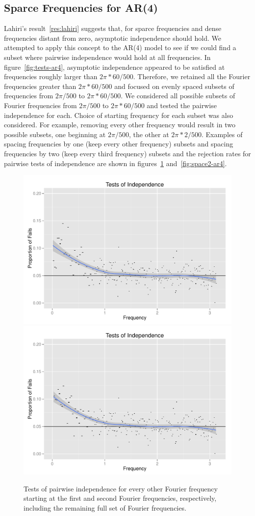 \documentclass{article}\usepackage[]{graphicx}\usepackage[]{color}
\newenvironment{knitrout}{}{} %
\theoremstyle{plain}
\begin{document}
\subsection{Sparce Frequencies for AR(4)} \label{sec:sparce}
Lahiri's result~\ref{res:lahiri} suggests that, for sparce frequencies and dense frequencies distant from zero, asymptotic independence should hold. We attempted to apply this concept to the AR(4) model to see if we could find a subset where pairwise independence would hold at all frequencies. In figure~\ref{fig:tests-ar4}, asymptotic independence appeared to be satisfied at frequencies roughly larger than $2 \pi*60/500$.  Therefore, we retained all the Fourier frequencies greater than $2 \pi*60/500$ and focused on evenly spaced subsets of frequencies from $2\pi/500$ to $2\pi*60/500$. We considered all possible subsets of Fourier frequencies from $2\pi/500$ to $2\pi* 60/500$ and tested the pairwise independence for each. Choice of starting frequency for each subset was also considered. For example, removing every other frequency would result in two possible subsets, one beginning at $2\pi/500$, the other at $2\pi*2/500$. Examples of spacing frequencies by one (keep every other frequency) subsets and spacing frequencies by two (keep every third frequency) subsets and the rejection rates for pairwise tests of independence are shown in figures~\ref{fig:space1-ar4} and~\ref{fig:space2-ar4}.

\begin{knitrout}
\color{fgcolor}\begin{figure}[h]

\includegraphics[width=.49\textwidth]{figure/space1-ar41} 
\includegraphics[width=.49\textwidth]{figure/space1-ar42} \caption[Tests of pairwise independence for every other Fourier frequency starting at the first and second Fourier frequencies, respectively, including the remaining full set of Fourier frequencies]{Tests of pairwise independence for every other Fourier frequency starting at the first and second Fourier frequencies, respectively, including the remaining full set of Fourier frequencies.\label{fig:space1-ar4}}
\end{figure}


\end{knitrout}
\end{document}
